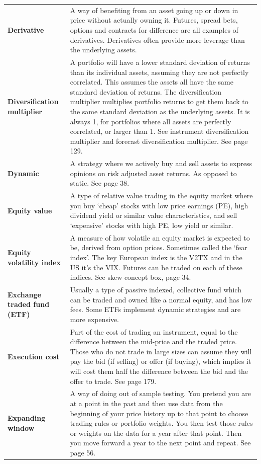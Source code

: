 {\begin{longtable}{@{}>{\raggedright\arraybackslash\bfseries} p{}>{\raggedright\arraybackslash} p{}@{}}
Derivative & A way of benefiting from an asset going up or down in price without actually owning it. Futures, spread bets, options and contracts for difference are all examples of derivatives. Derivatives often provide more leverage than the underlying assets. \\[0.65em]
Diversification multiplier & A portfolio will have a lower standard deviation of returns than its individual assets, assuming they are not perfectly correlated. This assumes the assets all have the same standard deviation of returns. The diversification multiplier multiplies portfolio returns to get them back to the same standard deviation as the underlying assets. It is always 1, for portfolios where all assets are perfectly correlated, or larger than 1. See instrument diversification multiplier and forecast diversification multiplier. See page 129. \\[0.65em]
Dynamic & A strategy where we actively buy and sell assets to express opinions on risk adjusted asset returns. As opposed to static. See page 38. \\[0.65em]
Equity value & A type of relative value trading in the equity market where you buy ‘cheap’ stocks with low price earnings (PE), high dividend yield or similar value characteristics, and sell ‘expensive’ stocks with high PE, low yield or similar. \\[0.65em]
Equity volatility index & A measure of how volatile an equity market is expected to be, derived from option prices. Sometimes called the ‘fear index’. The key European index is the V2TX and in the US it’s the VIX. Futures can be traded on each of these indices. See skew concept box, page 34. \\[0.65em]
Exchange traded fund (ETF) & Usually a type of passive indexed, collective fund which can be traded and owned like a normal equity, and has low fees. Some ETFs implement dynamic strategies and are more expensive. \\[0.65em]
Execution cost & Part of the cost of trading an instrument, equal to the difference between the mid-price and the traded price. Those who do not trade in large sizes can assume they will pay the bid (if selling) or offer (if buying), which implies it will cost them half the difference between the bid and the offer to trade. See page 179. \\[0.65em]
Expanding window & A way of doing out of sample testing. You pretend you are at a point in the past and then use data from the beginning of your price history up to that point to choose trading rules or portfolio weights. You then test those rules or weights on the data for a year after that point. Then you move forward a year to the next point and repeat. See page 56. \\[0.65em]

\end{longtable}}
